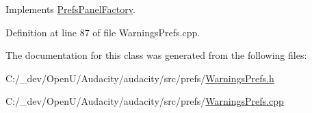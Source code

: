 Implements \hyperlink{class_prefs_panel_factory_a4814184d6050665a43f4929caa73aa0c}{Prefs\+Panel\+Factory}.



Definition at line 87 of file Warnings\+Prefs.\+cpp.



The documentation for this class was generated from the following files\+:\begin{DoxyCompactItemize}
\item 
C\+:/\+\_\+dev/\+Open\+U/\+Audacity/audacity/src/prefs/\hyperlink{_warnings_prefs_8h}{Warnings\+Prefs.\+h}\item 
C\+:/\+\_\+dev/\+Open\+U/\+Audacity/audacity/src/prefs/\hyperlink{_warnings_prefs_8cpp}{Warnings\+Prefs.\+cpp}\end{DoxyCompactItemize}
